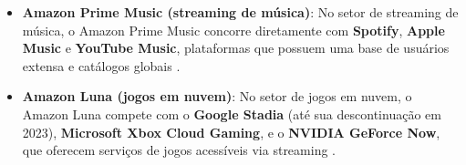 \begin{itemize}
    \item \textbf{Amazon Prime Music (streaming de música)}: No setor de streaming de música, o Amazon Prime Music concorre diretamente com \textbf{Spotify}, \textbf{Apple Music} e \textbf{YouTube Music}, plataformas que possuem uma base de usuários extensa e catálogos globais \cite{musicCompetitors2024}.

    \item \textbf{Amazon Luna (jogos em nuvem)}: No setor de jogos em nuvem, o Amazon Luna compete com o \textbf{Google Stadia} (até sua descontinuação em 2023), \textbf{Microsoft Xbox Cloud Gaming}, e o \textbf{NVIDIA GeForce Now}, que oferecem serviços de jogos acessíveis via streaming \cite{lunaCompetitors2024}.
\end{itemize}

